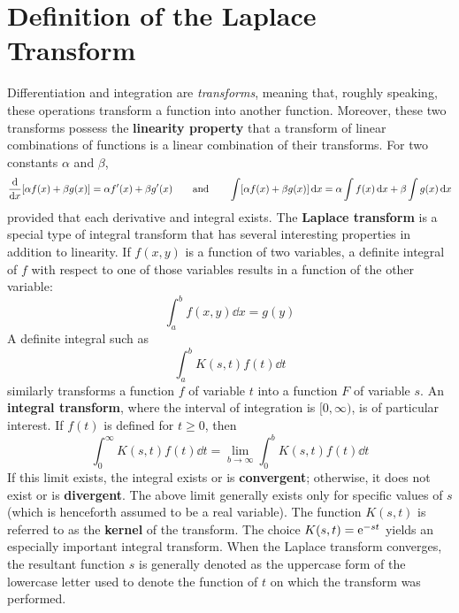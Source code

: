 \documentclass[./Differential Equations.tex]{subfiles}
\begin{document}
	\section{Definition of the Laplace Transform}
		Differentiation and integration are \textit{transforms}, meaning that, roughly speaking, these operations transform a function into another function. Moreover, these two transforms possess the \textbf{linearity property} that a transform of linear combinations of functions is a linear combination of their transforms. For two constants \(\alpha\) and \(\beta\),
			\[
				\dv{x}[\alpha f(x) + \beta g(x)] = \alpha f'(x) + \beta g'(x) \qquad \text{and} \qquad
				\int[\alpha f(x) + \beta g(x)]\dd{x} = \alpha\int f(x)\dd{x} + \beta\int g(x)\dd{x}
			\]
			provided that each derivative and integral exists. The \textbf{Laplace transform} is a special type of integral transform that has several interesting properties in addition to linearity.
			If \(f(x, y)\) is a function of two variables, a definite integral of \(f\) with respect to one of those variables results in a function of the other variable:
				\[\int_a^b f(x, y)\dd{x} = g(y)\]
				A definite integral such as
				\[\int_a^b K(s, t)f(t)\dd{t}\]
				similarly transforms a function \(f\) of variable \(t\) into a function \(F\) of variable \(s\). An \textbf{integral transform}, where the interval of integration is \([0, \infty)\), is of particular interest. If \(f(t)\) is defined for \(t \ge 0\), then
				\[\int_0^\infty K(s, t)f(t)\dd{t} = \lim_{b \to \infty}\int_0^b K(s, t)f(t) \dd{t}\]
				If this limit exists, the integral exists or is \textbf{convergent}; otherwise, it does not exist or is \textbf{divergent}. The above limit generally exists only for specific values of \(s\) (which is henceforth assumed to be a real variable).
			The function \(K(s, t)\) is referred to as the \textbf{kernel} of the transform. The choice \(K(s, t) = \text{e}^{-st}\) yields an especially important integral transform.
			When the Laplace transform converges, the resultant function \(s\) is generally denoted as the uppercase form of the lowercase letter used to denote the function of \(t\) on which the transform was performed. \\
\end{document}
